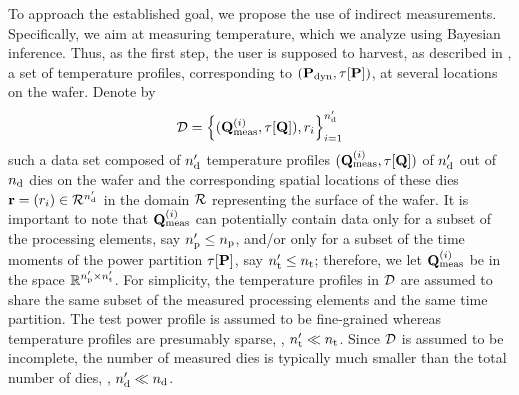 To approach the established goal, we propose the use of indirect measurements. Specifically, we aim at measuring temperature, which we analyze using Bayesian inference. Thus, as the first step, the user is supposed to harvest, as described in , a set of temperature profiles, corresponding to $(\mathbf{P}_{\text{dyn}}, \tau[\mathbf{P}])$, at several locations on the wafer. Denote by
\[
  \mathcal{D} = \left\{ (\mathbf{Q}^{(i)}_{\text{meas}}, \tau[\mathbf{Q}]), r_i \right\}_{i = 1}^{n_\text{d}'}
\]
such a data set composed of ${n_\text{d}'}$ temperature profiles $(\mathbf{Q}^{(i)}_{\text{meas}}, \tau[\mathbf{Q}])$ of ${n_\text{d}'}$ out of ${n_\text{d}}$ dies on the wafer and the corresponding spatial locations of these dies $\mathbf{r} = (r_i) \in \mathcal{R}^{n_\text{d}'}$ in the domain $\mathcal{R}$ representing the surface of the wafer.
It is important to note that $\mathbf{Q}^{(i)}_{\text{meas}}$ can potentially contain data only for a subset of the processing elements, say ${n_\text{p}'} \leq {n_\text{p}}$, and/or only for a subset of the time moments of the power partition $\tau[\mathbf{P}]$, say ${n_\text{t}'} \leq {n_\text{t}}$; therefore, we let $\mathbf{Q}^{(i)}_{\text{meas}}$ be in the space $\mathbb{R}^{{n_\text{p}'} \times {n_\text{t}'}}$.
For simplicity, the temperature profiles in $\mathcal{D}$ are assumed to share the same subset of the measured processing elements and the same time partition.
The test power profile is assumed to be fine-grained whereas temperature profiles are presumably sparse, \ie, ${n_\text{t}'} \ll {n_\text{t}}$.
Since $\mathcal{D}$ is assumed to be incomplete, the number of measured dies is typically much smaller than the total number of dies, \ie, ${n_\text{d}'} \ll {n_\text{d}}$.
